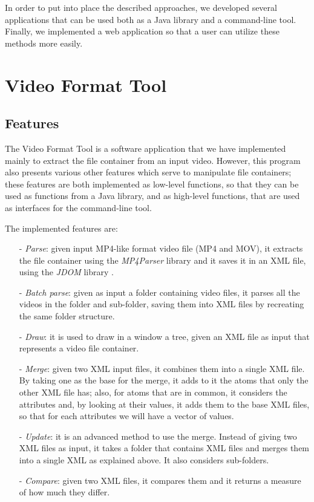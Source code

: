 In order to put into place the described approaches, we developed several applications that can be used both as a Java library and a command-line tool. Finally, we implemented a web application so that a user can utilize these methods more easily.

\section{Video Format Tool}

\subsection{Features}

The Video Format Tool is a software application that we have implemented mainly to extract the file container from an input video. However, this program also presents various other features which serve to manipulate file containers; these features are both implemented as low-level functions, so that they can be used as functions from a Java library, and as high-level functions, that are used as interfaces for the command-line tool.

The implemented features are:
\begin{itemize}
\item[-] \emph{Parse}: given input MP4-like format video file (MP4 and MOV), it extracts the file container using the \emph{MP4Parser} library \cite{mp4parser} and it saves it in an XML file, using the \emph{JDOM} library \cite{jdom}.
\item[-] \emph{Batch parse}: given as input a folder containing video files, it parses all the videos in the folder and sub-folder, saving them into XML files by recreating the same folder structure.
\item[-] \emph{Draw}: it is used to draw in a window a tree, given an XML file as input that represents a video file container.
\item[-] \emph{Merge}: given two XML input files, it combines them into a single XML file. By taking one as the base for the merge, it adds to it the atoms that only the other XML file has; also, for atoms that are in common, it considers the attributes and, by looking at their values, it adds them to the base XML files, so that for each attributes we will have a vector of values.
\item[-] \emph{Update}: it is an advanced method to use the merge. Instead of giving two XML files as input, it takes a folder that contains XML files and merges them into a single XML as explained above. It also considers sub-folders.
\item[-] \emph{Compare}: given two XML files, it compares them and it returns a measure of how much they differ.
\end{itemize}

